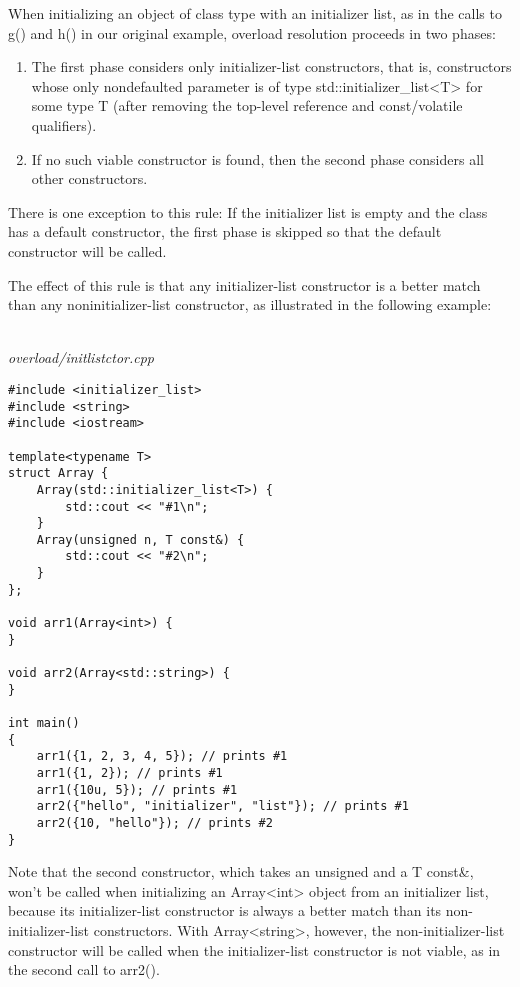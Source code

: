 When initializing an object of class type with an initializer list, as in the calls to g() and h() in our original example, overload resolution proceeds in two phases:

\begin{enumerate}
\item
The first phase considers only initializer-list constructors, that is, constructors whose only nondefaulted parameter is of type  std::initializer\_list<T> for some type T (after removing the top-level reference and const/volatile qualifiers).

\item
If no such viable constructor is found, then the second phase considers all other constructors.
\end{enumerate}

There is one exception to this rule: If the initializer list is empty and the class has a default constructor, the first phase is skipped so that the default constructor will be called.

The effect of this rule is that any initializer-list constructor is a better match than any noninitializer-list constructor, as illustrated in the following example:

\hspace*{\fill} \\ %
\noindent
\textit{overload/initlistctor.cpp}
\begin{lstlisting}[style=styleCXX]
#include <initializer_list>
#include <string>
#include <iostream>

template<typename T>
struct Array {
	Array(std::initializer_list<T>) {
		std::cout << "#1\n";
	}
	Array(unsigned n, T const&) {
		std::cout << "#2\n";
	}
};

void arr1(Array<int>) {
}

void arr2(Array<std::string>) {
}

int main()
{
	arr1({1, 2, 3, 4, 5}); // prints #1
	arr1({1, 2}); // prints #1
	arr1({10u, 5}); // prints #1
	arr2({"hello", "initializer", "list"}); // prints #1
	arr2({10, "hello"}); // prints #2
}
\end{lstlisting}

Note that the second constructor, which takes an unsigned and a T const\&, won’t be called when initializing an Array<int> object from an initializer list, because its initializer-list constructor is always a better match than its non-initializer-list  constructors. With Array<string>, however, the non-initializer-list constructor will be called when the initializer-list constructor is not viable, as in the second call to arr2().

